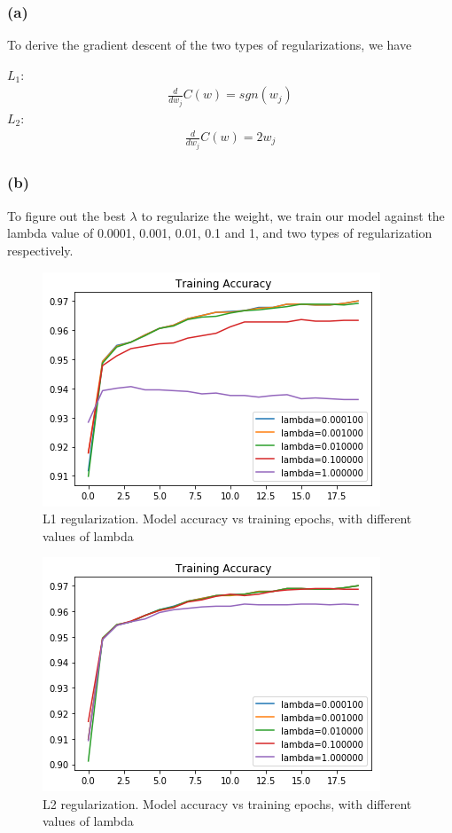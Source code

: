 \documentclass{article}
\begin{document}
\subsubsection*{(a)} 
To derive the gradient descent of the two types of regularizations, we have 

$L_1$: \begin{align*}
\frac{d}{dw_j}C(w) = sgn(w_j) 
\end{align*}
$L_2$: \begin{align*}
\frac{d}{dw_j}C(w) = 2w_j 
\end{align*}
\subsubsection*{(b)} 
To figure out the best $\lambda$ to regularize the weight, we train our model against the lambda value of 0.0001, 0.001, 0.01, 0.1 and 1, and two types of regularization respectively.
\begin{figure}[h]
	\centering
	\includegraphics[scale = 0.7]{pics/lambda_train_1.png}
	\caption{L1 regularization. Model accuracy vs training epochs, with different values of lambda}
\end{figure}
\begin{figure}[h]
	\centering
	\includegraphics[scale = 0.7]{pics/lambda_train_2.png}
	\caption{L2 regularization. Model accuracy vs training epochs, with different values of lambda}
\end{figure}
\end{document}
